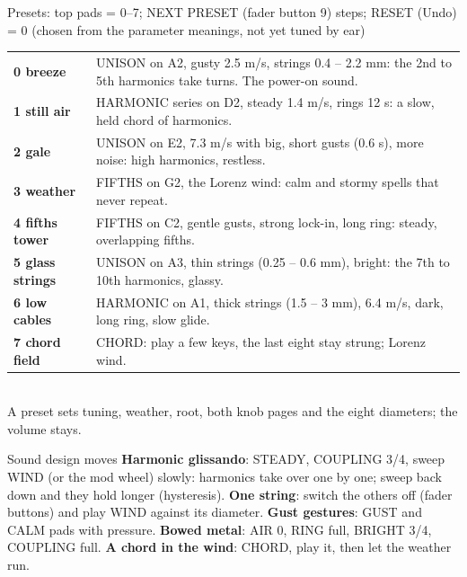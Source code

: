 \documentclass{article}
\begin{document}
\vspace{1.5mm}
\begin{minipage}[t]{150mm}\vspace{0pt}
\begin{card}{Presets: top pads = 0--7; NEXT PRESET (fader button 9) steps; RESET (Undo) = 0 \quad\textmd{\fontsize{6.5}{7}\selectfont (chosen from the parameter meanings, not yet tuned by ear)}}
\fontsize{7.2}{8.7}\selectfont
\begin{tabularx}{\linewidth}{@{}>{\bfseries}l L@{}}
0 breeze & UNISON on A2, gusty 2.5 m/s, strings 0.4 -- 2.2 mm: the 2nd to 5th harmonics take turns. The power-on sound. \\
1 still air & HARMONIC series on D2, steady 1.4 m/s, rings 12 s: a slow, held chord of harmonics. \\
2 gale & UNISON on E2, 7.3 m/s with big, short gusts (0.6 s), more noise: high harmonics, restless. \\
3 weather & FIFTHS on G2, the Lorenz wind: calm and stormy spells that never repeat. \\
4 fifths tower & FIFTHS on C2, gentle gusts, strong lock-in, long ring: steady, overlapping fifths. \\
5 glass strings & UNISON on A3, thin strings (0.25 -- 0.6 mm), bright: the 7th to 10th harmonics, glassy. \\
6 low cables & HARMONIC on A1, thick strings (1.5 -- 3 mm), 6.4 m/s, dark, long ring, slow glide. \\
7 chord field & CHORD: play a few keys, the last eight stay strung; Lorenz wind. \\
\end{tabularx}\\[0.3mm]
A preset sets tuning, weather, root, both knob pages and the eight diameters; the volume stays.
\end{card}

\begin{card}{Sound design moves}
\fontsize{7.4}{9.0}\selectfont
\textbf{Harmonic glissando}: STEADY, COUPLING 3/4, sweep WIND (or the mod wheel) slowly: harmonics take over one
by one; sweep back down and they hold longer (hysteresis).\quad
\textbf{One string}: switch the others off (fader buttons) and play WIND against its diameter.\quad
\textbf{Gust gestures}: GUST and CALM pads with pressure.\quad
\textbf{Bowed metal}: AIR 0, RING full, BRIGHT 3/4, COUPLING full.\quad
\textbf{A chord in the wind}: CHORD, play it, then let the weather run.
\end{card}
\end{minipage}\hfill
\end{document}
